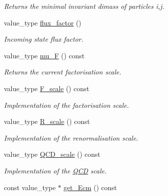 \begin{DoxyCompactItemize}
\begin{DoxyCompactList}\small\item\em Returns the minimal invariant dimass of particles i,j. \end{DoxyCompactList}\item 
\hypertarget{a00450_af4e5ffb99e4c314864782c45b591f51f}{}value\+\_\+type \hyperlink{a00450_af4e5ffb99e4c314864782c45b591f51f}{flux\+\_\+factor} ()\label{a00450_af4e5ffb99e4c314864782c45b591f51f}

\begin{DoxyCompactList}\small\item\em Incoming state flux factor. \end{DoxyCompactList}\item 
\hypertarget{a00450_a0335e9bf3b57266a267c39afd9194ce4}{}value\+\_\+type \hyperlink{a00450_a0335e9bf3b57266a267c39afd9194ce4}{mu\+\_\+\+F} () const \label{a00450_a0335e9bf3b57266a267c39afd9194ce4}

\begin{DoxyCompactList}\small\item\em Returns the current factorisation scale. \end{DoxyCompactList}\item 
\hypertarget{a00450_a1d4a32e7e2d3d1ef80e96638885ff7ac}{}value\+\_\+type \hyperlink{a00450_a1d4a32e7e2d3d1ef80e96638885ff7ac}{F\+\_\+scale} () const \label{a00450_a1d4a32e7e2d3d1ef80e96638885ff7ac}

\begin{DoxyCompactList}\small\item\em Implementation of the factorisation scale. \end{DoxyCompactList}\item 
\hypertarget{a00450_a6ceb7f36ace9b19cd959d0307adfa323}{}value\+\_\+type \hyperlink{a00450_a6ceb7f36ace9b19cd959d0307adfa323}{R\+\_\+scale} () const \label{a00450_a6ceb7f36ace9b19cd959d0307adfa323}

\begin{DoxyCompactList}\small\item\em Implementation of the renormalisation scale. \end{DoxyCompactList}\item 
\hypertarget{a00450_a881e5ac4af90371c65ec92b91b4fb545}{}value\+\_\+type \hyperlink{a00450_a881e5ac4af90371c65ec92b91b4fb545}{Q\+C\+D\+\_\+scale} () const \label{a00450_a881e5ac4af90371c65ec92b91b4fb545}

\begin{DoxyCompactList}\small\item\em Implementation of the \hyperlink{a00460}{Q\+C\+D} scale. \end{DoxyCompactList}\item 
\hypertarget{a00450_af3ba9e129ae7001887ad013f2c615cd6}{}const value\+\_\+type $\ast$ \hyperlink{a00450_af3ba9e129ae7001887ad013f2c615cd6}{get\+\_\+\+Ecm} () const \label{a00450_af3ba9e129ae7001887ad013f2c615cd6}


\end{DoxyCompactItemize}
